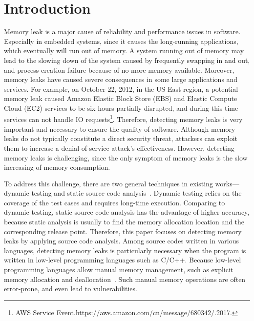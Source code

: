 \section{Introduction}\label{sec:intro}
Memory leak is a major cause of reliability and performance issues in software. Especially in embedded systems, since it causes the long-running applications, which eventually will run out of memory. 
A system running out of memory may lead to the slowing down of the system caused by frequently swapping in and out, and process creation failure because of no more memory available. Moreover, memory leaks have caused severe consequences in some large applications and services. For example, on October 22, 2012, in the US-East region, a potential memory leak caused Amazon Elastic Block Store (EBS) and Elastic Compute Cloud (EC2) services to be six hours partially disrupted, and during this time services can not handle IO requests\footnote{ AWS Service Event.https://aws.amazon.com/cn/message/680342/.2017.}. 
Therefore, detecting memory leaks is very important and necessary to ensure the quality of software. Although memory leaks do not typically constitute a direct security threat, attackers can exploit them to increase a denial-of-service attack’s effectiveness.
However, detecting memory leaks is challenging, since the only symptom of memory leaks is the slow increasing of memory consumption.  

To address this challenge, there are two general techniques in existing works---dynamic testing and static source code analysis~\cite{AJ06}. 
Dynamic testing relies on the coverage of the test cases and requires long-time execution. Comparing to dynamic testing, static source code analysis has the advantage of higher accuracy, because static analysis is usually to find the memory allocation location and the corresponding release point.
Therefore, this paper focuses on detecting memory leaks by applying source code analysis.
Among source codes written in various languages, detecting memory leaks is particularly necessary when the program is written in low-level programming languages such as C/C++. Because low-level programming languages allow manual memory management, such as explicit memory allocation and deallocation~\cite{KJMP06}. Such manual memory operations are often error-prone, and even lead to vulnerabilities. 

